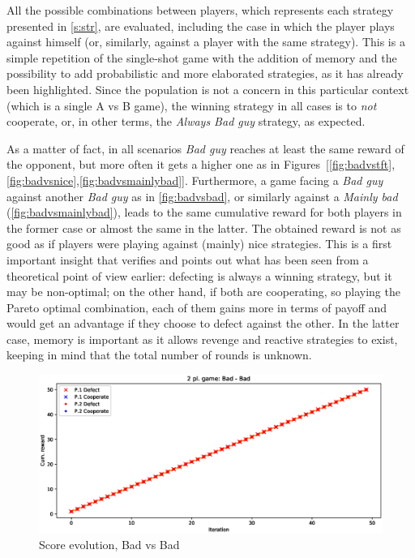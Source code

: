 \documentclass[journal,10pt,twoside]{IEEEtran}
\begin{document}
All the possible combinations between players, which represents each strategy presented in \autoref{s:str}, are evaluated, including the case in which the player plays against himself (or, similarly, against a player with the same strategy).
This is a simple repetition of the single-shot game with the addition of memory and the possibility to add probabilistic and more elaborated strategies, as it has already been highlighted. Since the population is not a concern in this particular context (which is a single A vs B game), the winning strategy in all cases is to \textit{not} cooperate, or, in other terms, the \textit{Always Bad guy} strategy, as expected.

As a matter of fact, in all scenarios \textit{Bad guy} reaches at least the same reward of the opponent, but more often it gets a higher one as in Figures~[\ref{fig:badvstft},\ref{fig:badvsnice},\ref{fig:badvsmainlybad}]. 
Furthermore, a game facing a \textit{Bad guy} against another \textit{Bad guy} as in \autoref{fig:badvsbad}, or similarly against a \textit{Mainly bad} (\autoref{fig:badvsmainlybad}), leads to the same cumulative reward for both players in the former case or almost the same in the latter. The obtained reward is not as good as if players were playing against (mainly) nice strategies.
This is a first important insight that verifies and points out what has been seen from a theoretical point of view earlier: defecting is always a winning strategy, but it may be non-optimal; on the other hand, if both are cooperating, so playing the Pareto optimal combination, each of them gains more in terms of payoff and would get an advantage if they choose to defect against the other. In the latter case, memory is important as it allows revenge and reactive strategies to exist, keeping in mind that the total number of rounds is unknown. 


\begin{figure}[!ht]
    \centering
    \includegraphics[width=.9\columnwidth]{../img/ipd2p/ipd2p-rewards-Bad-Bad}
    \caption{Score evolution, Bad vs Bad}
    \label{fig:badvsbad}
\end{figure}
\end{document}
